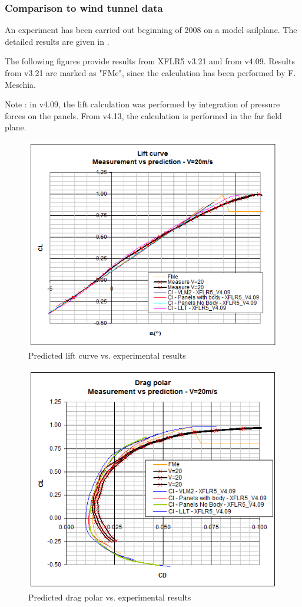 \documentclass[a4paper,twoside,12pt,dvips]{article}
\begin{document}
\subsubsection{Comparison to wind tunnel data}

An experiment has been carried out beginning of 2008 on a model
sailplane. The detailed results are given in \cite{DeperroisResults}.

The following figures provide results from XFLR5 v3.21 and from v4.09.
Results from v3.21 are marked as "FMe", since the calculation has
been performed by F. Meschia.

Note : in v4.09, the lift calculation was performed by integration of
pressure forces on the panels. From v4.13, the calculation is
performed in the far field plane.

\begin{figure}[htbp]
  \includegraphics[width=0.8\linewidth]{img-37}\centering 
  \caption{Predicted lift curve vs. experimental results}
  \label{fig:predicted_lift_curve_vs_experimental_results}
\end{figure}

\begin{figure}[htbp]
  \includegraphics[width=0.8\linewidth]{img-38}\centering 
  \caption{Predicted drag polar vs. experimental results}
  \label{fig:predicted_drag_polar_vs_experimental_results}
\end{figure}
\end{document}
